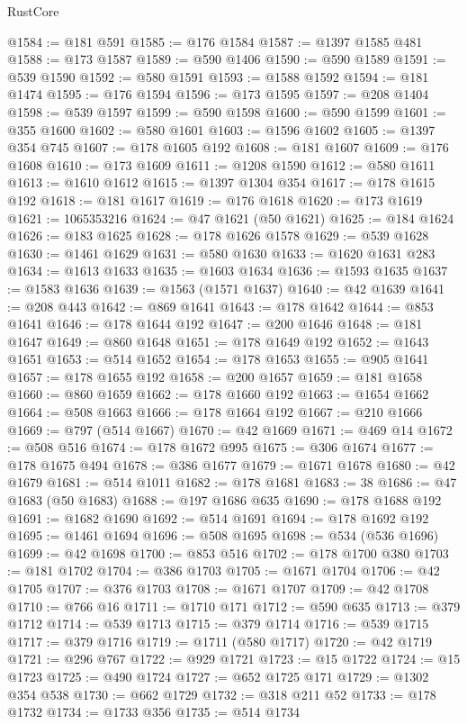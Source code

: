 \begin{lexlean}{RustCore}
\begin{coremodule}
@1584 := @181 @591
@1585 := @176 @1584
@1587 := @1397 @1585 @481
@1588 := @173 @1587
@1589 := @590 @1406
@1590 := @590 @1589
@1591 := @539 @1590
@1592 := @580 @1591
@1593 := @1588 @1592
@1594 := @181 @1474
@1595 := @176 @1594
@1596 := @173 @1595
@1597 := @208 @1404
@1598 := @539 @1597
@1599 := @590 @1598
@1600 := @590 @1599
@1601 := @355 @1600
@1602 := @580 @1601
@1603 := @1596 @1602
@1605 := @1397 @354 @745
@1607 := @178 @1605 @192
@1608 := @181 @1607
@1609 := @176 @1608
@1610 := @173 @1609
@1611 := @1208 @1590
@1612 := @580 @1611
@1613 := @1610 @1612
@1615 := @1397 @1304 @354
@1617 := @178 @1615 @192
@1618 := @181 @1617
@1619 := @176 @1618
@1620 := @173 @1619
@1621 := 1065353216
@1624 := @47 @1621 (@50 @1621)
@1625 := @184 @1624
@1626 := @183 @1625
@1628 := @178 @1626 @1578
@1629 := @539 @1628
@1630 := @1461 @1629
@1631 := @580 @1630
@1633 := @1620 @1631 @283
@1634 := @1613 @1633
@1635 := @1603 @1634
@1636 := @1593 @1635
@1637 := @1583 @1636
@1639 := @1563 (@1571 @1637)
@1640 := @42 @1639
@1641 := @208 @443
@1642 := @869 @1641
@1643 := @178 @1642
@1644 := @853 @1641
@1646 := @178 @1644 @192
@1647 := @200 @1646
@1648 := @181 @1647
@1649 := @860 @1648
@1651 := @178 @1649 @192
@1652 := @1643 @1651
@1653 := @514 @1652
@1654 := @178 @1653
@1655 := @905 @1641
@1657 := @178 @1655 @192
@1658 := @200 @1657
@1659 := @181 @1658
@1660 := @860 @1659
@1662 := @178 @1660 @192
@1663 := @1654 @1662
@1664 := @508 @1663
@1666 := @178 @1664 @192
@1667 := @210 @1666
@1669 := @797 (@514 @1667)
@1670 := @42 @1669
@1671 := @469 @14
@1672 := @508 @516
@1674 := @178 @1672 @995
@1675 := @306 @1674
@1677 := @178 @1675 @494
@1678 := @386 @1677
@1679 := @1671 @1678
@1680 := @42 @1679
@1681 := @514 @1011
@1682 := @178 @1681
@1683 := 38
@1686 := @47 @1683 (@50 @1683)
@1688 := @197 @1686 @635
@1690 := @178 @1688 @192
@1691 := @1682 @1690
@1692 := @514 @1691
@1694 := @178 @1692 @192
@1695 := @1461 @1694
@1696 := @508 @1695
@1698 := @534 (@536 @1696)
@1699 := @42 @1698
@1700 := @853 @516
@1702 := @178 @1700 @380
@1703 := @181 @1702
@1704 := @386 @1703
@1705 := @1671 @1704
@1706 := @42 @1705
@1707 := @376 @1703
@1708 := @1671 @1707
@1709 := @42 @1708
@1710 := @766 @16
@1711 := @1710 @171
@1712 := @590 @635
@1713 := @379 @1712
@1714 := @539 @1713
@1715 := @379 @1714
@1716 := @539 @1715
@1717 := @379 @1716
@1719 := @1711 (@580 @1717)
@1720 := @42 @1719
@1721 := @296 @767
@1722 := @929 @1721
@1723 := @15 @1722
@1724 := @15 @1723
@1725 := @490 @1724
@1727 := @652 @1725 @171
@1729 := @1302 @354 @538
@1730 := @662 @1729
@1732 := @318 @211 @52
@1733 := @178 @1732
@1734 := @1733 @356
@1735 := @514 @1734

\end{coremodule}
\end{lexlean}
